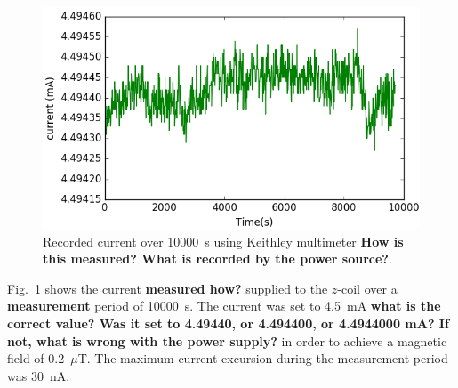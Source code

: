 \begin{figure}%
\centering
\includegraphics[width=0.6\linewidth]{figures/current}
\caption{Recorded current over 10000~s using Keithley multimeter %
{\bf How is this measured?  What is recorded by the power
    source?}.\label{fig:current} }
\end{figure}

Fig.~\ref{fig:current} shows the current {\bf measured how?} supplied
to the $z$-coil over a {\bf measurement} period of 10000~s.  The
current was set to 4.5~mA {\bf what is the correct value?  Was it set
  to 4.49440, or 4.494400, or 4.4944000 mA?  If not, what is wrong
  with the power supply?} in order to achieve a magnetic field of
0.2~$\mu$T.  The maximum current excursion during the measurement
period was 30~nA.




